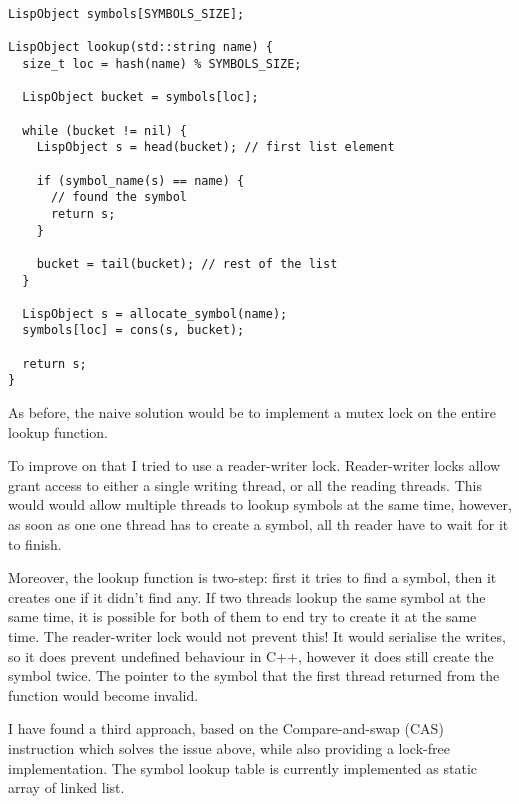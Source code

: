 \begin{verbatim}
LispObject symbols[SYMBOLS_SIZE];

LispObject lookup(std::string name) {
  size_t loc = hash(name) % SYMBOLS_SIZE;

  LispObject bucket = symbols[loc];

  while (bucket != nil) {
    LispObject s = head(bucket); // first list element

    if (symbol_name(s) == name) {
      // found the symbol
      return s;
    }

    bucket = tail(bucket); // rest of the list
  }

  LispObject s = allocate_symbol(name);
  symbols[loc] = cons(s, bucket);

  return s;
}
\end{verbatim}

As before, the naive solution would be to implement a mutex lock on the entire
lookup function.

To improve on that I tried to use a reader-writer lock. Reader-writer locks allow grant access
to either a single writing thread, or all the reading threads. This would would allow multiple
threads to lookup symbols at the same time, however, as soon as one one thread has to create a
symbol, all th reader have to wait for it to finish.

Moreover, the lookup function is two-step: first it tries to find a symbol, then it creates one
if it didn't find any. If two threads lookup the same symbol at the same time, it is possible for
both of them to end try to create it at the same time. The reader-writer lock would not prevent this!
It would serialise the writes, so it does prevent undefined behaviour in C++, however it does still
create the symbol twice. The pointer to the symbol that the first thread returned from the function
would become invalid.

I have found a third approach, based on the Compare-and-swap (CAS) instruction which solves the issue
above, while also providing a lock-free implementation. The symbol lookup table is currently implemented
as static array of linked list.

